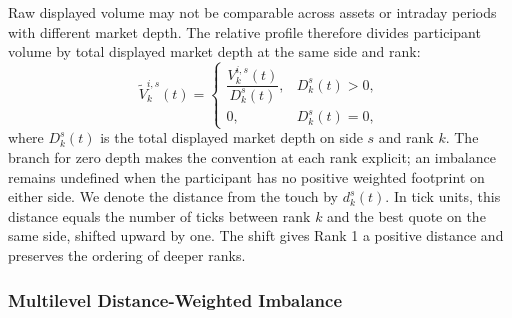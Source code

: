 \documentclass[11pt]{article}
\newenvironment{review}{\begingroup\color{blue}}{\endgroup}
\begin{document}
Raw displayed volume may not be comparable across assets or intraday periods with different market depth. The relative
profile therefore divides participant volume by total displayed market depth at the same side and rank:
\begin{equation}
    \widetilde V^{i,s}_{k}(t)
    =\begin{cases}
    \dfrac{V^{i,s}_{k}(t)}{D^{s}_{k}(t)},
    & D^{s}_{k}(t)>0,\\
    0,
    & D^{s}_{k}(t)=0,
    \end{cases}
    \label{eq:relative_agent_depth}
\end{equation}
where $D^{s}_{k}(t)$ is the total displayed market depth on side $s$ and rank $k$. \begin{review}The branch for zero depth makes the convention at each rank explicit\end{review}; an imbalance remains undefined when the participant has no positive weighted footprint on
either side.
We denote the distance from the touch by $d^{s}_{k}(t)$. In tick units, this distance equals the number of ticks between
rank $k$ and \begin{review}the best quote on the same side\end{review}, shifted upward by one. The shift gives Rank 1 a positive distance and preserves the
ordering of deeper ranks.

\subsubsection{Multilevel Distance-Weighted Imbalance}
\label{subsec:multilevel_dwi}
\end{document}
